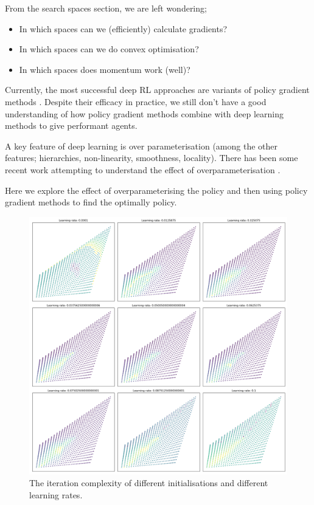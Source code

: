 From the search spaces section, we are left wondering;

\begin{itemize}
\tightlist
\item In which spaces can we (efficiently) calculate gradients?
\item In which spaces can we do convex optimisation?
\item In which spaces does momentum work (well)?
\end{itemize}

Currently, the most successful deep RL approaches are variants of policy gradient methods \cite{Mnih2016,Schulmanb}.
Despite their efficacy in practice, we still don't have a good understanding of
how policy gradient methods combine with deep learning methods to give performant agents.

A key feature of deep learning is over parameterisation (among the other features;
hierarchies, non-linearity, smoothness, locality). There has been some recent work
attempting to understand the effect of overparameterisation \cite{Arora2018}.

Here we explore the effect of overparameterising the policy and then using
policy gradient methods to find the optimally policy.

\begin{figure}
\centering
\includegraphics[width=1.0\textwidth,height=1.0\textheight]{../../pictures/figures/iteration-lr-0.png}
\caption{The iteration complexity of different initialisations and different learning rates.}
\end{figure}

